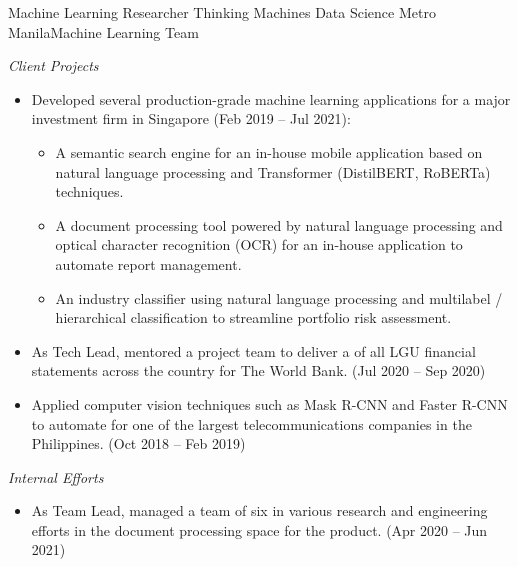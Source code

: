 \documentclass[12pt,a4paper]{moderncv}
\begin{document}
{Machine Learning Researcher}
{Thinking Machines Data Science}
{Metro Manila}{Machine Learning Team}
{
    \vspace{3px}
    \textit{Client Projects}
    \begin{itemize}
        \item Developed several production-grade machine learning applications
            for a major investment firm in Singapore (Feb 2019 -- Jul 2021): 
            \begin{itemize}
                \item A semantic search engine for an in-house mobile
                    application based on natural language processing and
                    Transformer (DistilBERT, RoBERTa) techniques. 
                \item A document processing tool powered by natural language
                    processing and optical character recognition (OCR) for an
                    in-house application to automate report management.
                \item An industry classifier using natural language processing
                    and multilabel / hierarchical classification to
                    streamline portfolio risk assessment. 
            \end{itemize}
        \item As Tech Lead, mentored a project team to deliver a {\color{blue}
            } of all LGU financial statements across the
            country for The World Bank.  (Jul 2020 -- Sep 2020)
        \item Applied computer vision techniques such as Mask R-CNN and Faster
        R-CNN to automate {\color{blue}}
        for one of the largest telecommunications companies in the Philippines.
        (Oct 2018 -- Feb 2019)
    \end{itemize}
    \vspace{3px}
    \textit{Internal Efforts}
    \begin{itemize}
        \item As Team Lead, managed a team of six in various research and
            engineering efforts in the document processing space for the
            {\color{blue}}
            product. (Apr 2020 -- Jun 2021)
    \end{itemize}
}
\vspace{0.5em}
\end{document}

